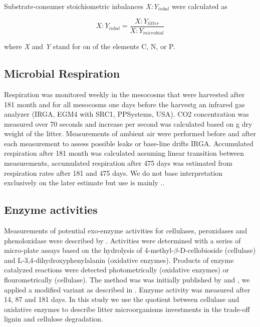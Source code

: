 Substrate-consumer stoichiometric inbalances \emph{X:Y$_{inbal}$} were calculated as

 \begin{equation}
X:Y_{inbal}=\frac{X:Y_{litter}}{X:Y_{microbial}} \label{eq:resp.acc}
 \end{equation}

where \emph{X} and \emph{Y} stand for on of the elements C, N, or P.

\subsection{Microbial Respiration}
Respiration was monitored weekly in the mesocosms that were harvested after 181 month and for all mesocosms one days before the harvestg an infrared gas analyzer (IRGA, EGM4 with SRC1, PPSystems, USA). CO2 concentration was measured over 70 seconds and increase per second was calculated based on g dry weight of the litter. Measurements of ambient air were performed before and after each measurement to assess possible leaks or base-line drifts IRGA. %
Accumulated respiration after 181 month was calculated assuming linear transition between measurements, accumulated respiration after 475 days was estimated from respiration rates after 181 and 475 days. We do not base interpretation exclusively on the later estimate but use is mainly ..


\subsection{Enzyme activities}

Measurements of potential exo-enzyme activities for cellulases, peroxidases and phenoloxidase were described by \cite{Leitner2011}. Activities were determined with a series of micro-plate assays based on the hydrolysis of 4-methyl-$\beta$-D-cellobioside (cellulase) and L-3,4-di\-hydroxy\-phenyl\-alanin (oxidative enzymes). Products of enzyme catalyzed reactions were detected photometrically (oxidative enzymes) or flourometrically (cellulase). The method was was initially published by \cite{Marx2001} and \cite{Sinsabaugh1999}, we applied a modified variant as described in \cite{Kaiser2010b}. Enzyme activity was measured after 14, 87 and 181 days. In this study we use the quotient between cellulase and oxidative enzymes to describe litter microorganisms investments in the trade-off lignin and cellulose degradation. 

